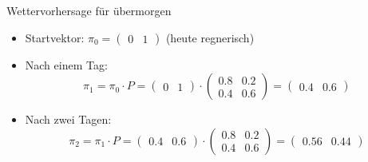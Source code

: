 \begin{frame}{Wettervorhersage für übermorgen}
    \begin{itemize}[<+->]
        \item Startvektor: \(\pi_0 = \begin{pmatrix} 0 & 1 \end{pmatrix}\) \hspace{0.5em} (heute regnerisch)
        \item Nach einem Tag:
              \[
                  \pi_1 = \pi_0 \cdot P = \begin{pmatrix} 0 & 1 \end{pmatrix} \cdot \begin{pmatrix} 0.8 & 0.2 \\ 0.4 & 0.6 \end{pmatrix} = \begin{pmatrix} 0.4 & 0.6 \end{pmatrix}
              \]
        \item Nach zwei Tagen:
              \[
                  \pi_2 = \pi_1 \cdot P = \begin{pmatrix} 0.4 & 0.6 \end{pmatrix} \cdot \begin{pmatrix} 0.8 & 0.2 \\ 0.4 & 0.6 \end{pmatrix} = \begin{pmatrix} 0.56 & 0.44 \end{pmatrix}
              \]
    \end{itemize}

\end{frame}
